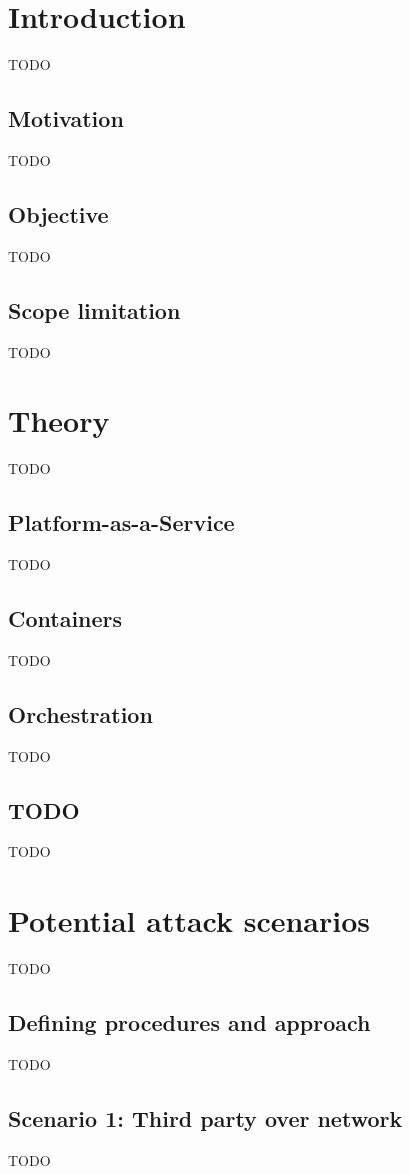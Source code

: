 \chapter{Introduction}
TODO

\section{Motivation}
TODO

\section{Objective}
TODO

\section{Scope limitation}
TODO

\chapter{Theory}
TODO

\section{Platform-as-a-Service}
TODO

\section{Containers}
TODO

\section{Orchestration}
TODO

\section{TODO}
TODO

\chapter{Potential attack scenarios}
TODO

\section{Defining procedures and approach}
TODO

\section{Scenario 1: Third party over network}
TODO

